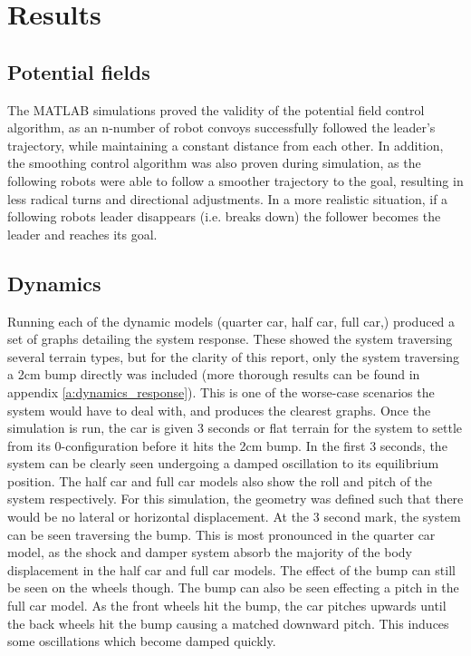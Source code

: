 \chapter{Results}
\section{Potential fields}
The MATLAB simulations proved the validity of the potential field control algorithm, as an n-number of robot convoys successfully followed the leader's trajectory, while maintaining a constant distance from each other. In addition, the smoothing control algorithm was also proven during simulation, as the following robots were able to follow a smoother trajectory to the goal, resulting in less radical turns and directional adjustments. In a more realistic situation, if a following robots leader disappears (i.e. breaks down) the follower becomes the leader and reaches its goal.

\section{Dynamics}
Running each of the dynamic models (quarter car, half car, full car,) produced a set of graphs detailing the system response. These showed the system traversing several terrain types, but for the clarity of this report, only the system traversing a 2cm bump directly was included (more thorough results can be found in appendix \ref{a:dynamics_response}). This is one of the worse-case scenarios the system would have to deal with, and produces the clearest graphs. Once the simulation is run, the car is given 3 seconds or flat terrain for the system to settle from its 0-configuration before it hits the 2cm bump. In the first 3 seconds, the system can be clearly seen undergoing a damped oscillation to its equilibrium position. The half car and full car models also show the roll and pitch of the system respectively. For this simulation, the geometry was defined such that there would be no lateral or horizontal displacement. At the 3 second mark, the system can be seen traversing the bump. This is most pronounced in the quarter car model, as the shock and damper system absorb the majority of the body displacement in the half car and full car models. The effect of the bump can still be seen on the wheels though. The bump can also be seen effecting a pitch in the full car model. As the front wheels hit the bump, the car pitches upwards until the back wheels hit the bump causing a matched downward pitch. This induces some oscillations which become damped quickly.

